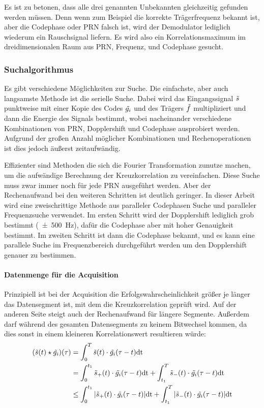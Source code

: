 Es ist zu betonen, dass alle drei genannten Unbekannten gleichzeitig gefunden werden müssen. Denn wenn zum Beispiel die korrekte Trägerfrequenz bekannt ist, aber die Codephase oder PRN falsch ist, wird der Demodulator lediglich wiederum ein Rauschsignal liefern. Es wird also ein Korrelationsmaximum im dreidimensionalen Raum aus PRN, Frequenz, und Codephase gesucht.

\subsubsection{Suchalgorithmus}
Es gibt verschiedene Möglichkeiten zur Suche. Die einfachste, aber auch langsamste Methode ist die serielle Suche. Dabei wird das Eingangssignal $\tilde{s}$ punktweise mit einer Kopie des Codes $\tilde{g_i}$ und des Trägers $\tilde{f}$ multipliziert und dann die Energie des Signals bestimmt, wobei nacheinander verschiedene Kombinationen von \gls{PRN}, Dopplershift und Codephase ausprobiert werden. Aufgrund der großen Anzahl möglicher Kombinationen und Rechenoperationen ist dies jedoch äußerst zeitaufwändig.

Effizienter sind Methoden die sich die Fourier Transformation zunutze machen, um die aufwändige Berechnung der Kreuzkorrelation zu vereinfachen. Diese Suche muss zwar immer noch für jede PRN ausgeführt werden. Aber der Rechenaufwand bei den weiteren Schritten ist deutlich geringer. 
In dieser Arbeit wird eine zweischrittige Methode aus paralleler Codephasen Suche und paralleler Frequenzsuche verwendet. Im ersten Schritt wird der Dopplershift lediglich grob bestimmt (\SI{\pm500}{\Hz}), dafür die Codephase aber mit hoher Genauigkeit bestimmt. Im zweiten Schritt ist dann die Codephase bekannt, und es kann eine parallele Suche im Frequenzbereich durchgeführt werden um den Dopplershift genauer zu bestimmen. 

\paragraph{Datenmenge für die Acquisition}
Prinzipiell ist bei der Acquisition die Erfolgswahrscheinlichkeit größer je länger das Datensegment ist, mit dem die Kreuzkorrelation geprüft wird. Auf der anderen Seite steigt auch der Rechenaufwand für längere Segmente. Außerdem darf während des gesamten Datensegments zu keinem Bitwechsel kommen, da dies sonst in einem kleineren Korrelationswert resultieren würde:
\begin{align}
   (\tilde{s}(t) \star \tilde{g_i})(\tau)  &= \int_0^T{\tilde{s}(t) \cdot \tilde{g_i}(\tau -t) \rm{d}t} \\
   &= \int_0^{t_1}{\tilde{s}_+(t) \cdot \tilde{g_i}(\tau -t) \rm{d}t}
     + \int_{t_1}^T{\tilde{s}_-(t) \cdot \tilde{g_i}(\tau -t) \rm{d}t}\\
   &\leq \int_0^{t_1}{|\tilde{s}_+(t) \cdot \tilde{g_i}(\tau -t)| \rm{d}t} 
     + \int_{t_1}^T{|\tilde{s}_-(t) \cdot \tilde{g_i}(\tau -t)| \rm{d}t}
\end{align}

